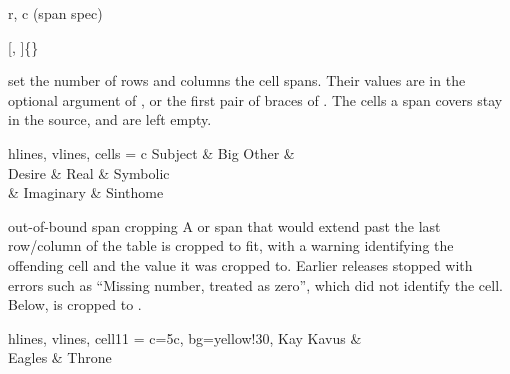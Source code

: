 \begin{codedescribe}[
    key,
    new=2021C,
    update=2021D
  ]{r, c (span spec)}
  \begin{codesyntax}
    [, ]\{\} 
  \end{codesyntax}
   set the number of rows and columns the cell spans. Their values are in the optional argument of , or the first pair of braces of . The cells a span covers stay in the source, and are left empty.

  \begin{codestore}[st=span:rc]
    \begin{tblr}{hlines, vlines, cells = {c}}
      Subject                & \SetCell[c=2]{} Big Other &          \\
      \SetCell[r=2]{} Desire & Real                      & Symbolic \\
                             & Imaginary                 & Sinthome
    \end{tblr}\end{codestore}
  \begin{center}
  \end{center}
\end{codedescribe}

\begin{codedescribe}[
    verb,
    new=2026A
  ]{out-of-bound span cropping}
  A  or  span that would extend past the last row/column of the table is cropped to fit, with a warning identifying the offending cell and the value it was cropped to. Earlier releases stopped with errors such as ``Missing number, treated as zero'', which did not identify the cell. Below,  is cropped to .

  \begin{codestore}[st=span:crop]
    \begin{tblr}{
        hlines, vlines,
        cell{1}{1} = {c=5}{c, bg=yellow!30},
      }
      Kay Kavus &        \\
      Eagles    & Throne
    \end{tblr}\end{codestore}
  \begin{center}
  \end{center}
\end{codedescribe}

